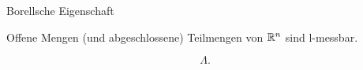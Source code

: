 \documentclass[class=article, crop=false]{standalone}
\begin{document}
\begin{zettel}{Borellsche Eigenschaft}

\begin{corollary}
	Offene Mengen (und abgeschlossene) Teilmengen von $\mathbb{R}^n$  sind l-messbar.
\end{corollary}
\[
	\Lambda
.\]

\end{zettel}
\end{document}
